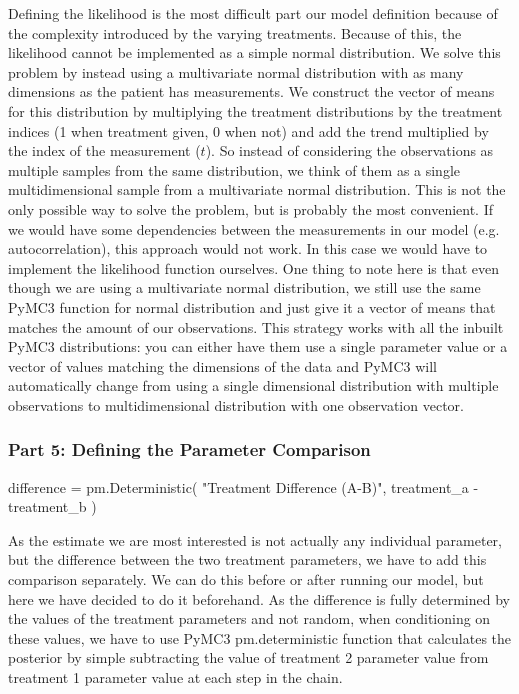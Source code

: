 \documentclass[12pt,a4paper,leqno]{report}
\theoremstyle{plain}
\theoremstyle{definition}
\theoremstyle{remark}
\begin{document}
Defining the likelihood is the most difficult part our model definition because of the
complexity introduced by the varying treatments. Because of this, the likelihood cannot
be implemented as a simple normal distribution. We solve this problem by instead using a
multivariate normal distribution with as many dimensions as the patient has
measurements. We construct the vector of means for this distribution by multiplying the
treatment distributions by the treatment indices (1 when
treatment given, 0 when not) and add the trend multiplied by the index of the
measurement (\(t\)). So instead of considering
the observations as multiple samples from the same distribution, we think of them as a
single multidimensional sample from
a multivariate normal distribution. This is not the only possible way to solve the
problem, but is probably the most convenient. If we would have some
dependencies between the measurements in our model (e.g. autocorrelation), this approach
would not work. In this case we would have to implement the likelihood function
ourselves. One thing to note here is that even though we are using a multivariate normal
distribution, we still use the same PyMC3 function for normal distribution and just give
it a vector of means that matches the amount of our observations. This strategy works
with all the inbuilt PyMC3 distributions: you can either have them use a single
parameter value or a vector of values matching the dimensions of the data and PyMC3 will automatically
change from using a single dimensional distribution with multiple observations to
multidimensional distribution with one observation vector.


\subsubsection*{Part 5: Defining the Parameter Comparison}

\bigskip
\begin{pyverbatim}[][fontsize=\footnotesize]
    difference = pm.Deterministic(
        "Treatment Difference (A-B)", treatment_a - treatment_b
    )
\end{pyverbatim}
\smallskip

As the estimate we are most interested is not actually any individual parameter, but the
difference between the two treatment parameters, we have to add this comparison separately.
We can do this before or after running our model, but here we have decided to do it
beforehand. As the difference is fully determined by the values of the treatment
parameters and not random, when conditioning on these values, we have to use PyMC3
pm.deterministic function that calculates the posterior
by simple subtracting the value of treatment 2 parameter value from treatment 1
parameter value at each step in the chain.
\end{document}
